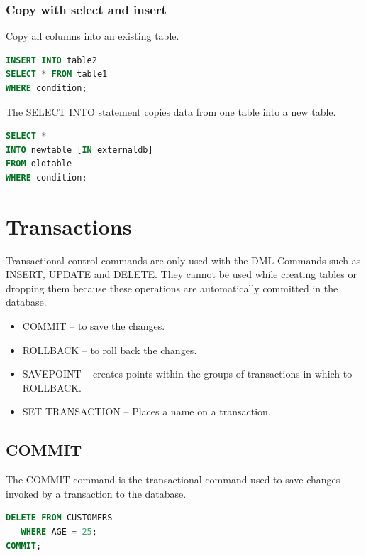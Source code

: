 \documentclass{article}
\begin{document}
\subsubsection{Copy with select and insert}
Copy all columns into an existing table.

\vspace{8pt} \begin{lstlisting}[language=SQL]
INSERT INTO table2
SELECT * FROM table1
WHERE condition;
\end{lstlisting} \vspace{8pt}

The SELECT INTO statement copies data from one table into a new table.
\vspace{8pt} \begin{lstlisting}[language=SQL]
SELECT *
INTO newtable [IN externaldb]
FROM oldtable
WHERE condition;
\end{lstlisting} \vspace{8pt}

\newpage
\section{Transactions}

Transactional control commands are only used with the DML Commands such as INSERT, UPDATE and DELETE. They cannot be used while creating tables or dropping them because these operations are automatically committed in the database.

\begin{itemize}
    \item COMMIT -- to save the changes.
    \item ROLLBACK -- to roll back the changes.
    \item SAVEPOINT -- creates points within the groups of transactions in which to ROLLBACK.
    \item  SET TRANSACTION -- Places a name on a transaction.
\end{itemize}

\subsection{COMMIT}

The COMMIT command is the transactional command used to save changes invoked by a transaction to the database.

\vspace{8pt} \begin{lstlisting}[language=SQL]
DELETE FROM CUSTOMERS
   WHERE AGE = 25;
COMMIT;
\end{lstlisting} \vspace{8pt}
\end{document}
